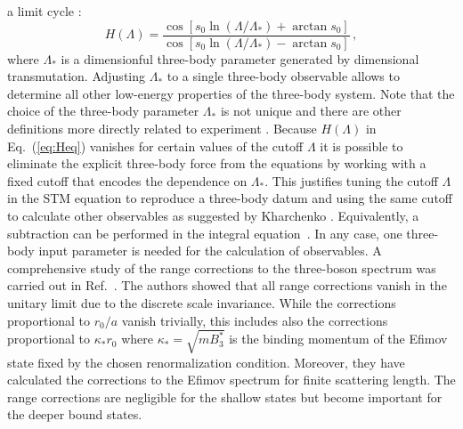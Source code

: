 \documentclass[aps,rmp,nofootinbib,twocolumn,floatfix]{revtex4}
\newcommand{\beq}{\begin{equation}}
\newcommand{\eeq}{\end{equation}}
\begin{document}
a limit cycle \cite{Bedaque:1998kg,Bedaque:1998km}:
\beq
H(\Lambda)=\frac{\cos[s_0 \ln(\Lambda/\Lambda_*)+\arctan s_0]}
{\cos[s_0 \ln(\Lambda/\Lambda_*)-\arctan s_0]}\,,
\label{eq:Heq}
\eeq
where $\Lambda_*$ is a dimensionful three-body parameter generated
by dimensional transmutation. Adjusting 
$\Lambda_*$ to a single three-body observable allows to determine all 
other low-energy properties of the three-body system.
Note that the choice of the three-body parameter $\Lambda_*$ is not unique
and there are other definitions more directly related to 
experiment \cite{Braaten:2004rn}.
Because $H(\Lambda)$ in Eq.~(\ref{eq:Heq}) vanishes for certain values of the 
cutoff $\Lambda$ it is possible to eliminate the explicit three-body force
from the equations by working with a fixed cutoff that encodes the
dependence on $\Lambda_*$. This justifies 
tuning the cutoff $\Lambda$ in the STM equation
to reproduce a three-body datum and using the same cutoff to calculate 
other observables as suggested by Kharchenko \cite{Kharchenko:1973aa}. 
Equivalently, a subtraction can  be
performed in the integral equation~\cite{Hammer:2000nf,Afnan:2003bs}.  
In any case, one
three-body input parameter is needed for the calculation of
observables.
A comprehensive study of the range corrections to the three-boson spectrum
was carried out in Ref.~\cite{Platter:2008cx}.
The authors showed that all range corrections vanish in the 
unitary limit due to the discrete scale invariance.
While the corrections proportional to $r_0 /a$ vanish trivially, 
this includes also the corrections proportional to 
$\kappa_* r_0$ where $\kappa_*=\sqrt{mB_3^*}$ is the binding momentum of the 
Efimov state fixed by the chosen renormalization condition.
Moreover, they have calculated the corrections to the Efimov spectrum
for finite scattering length. 
The range corrections are negligible for the 
shallow states but become important for the deeper bound states.
\end{document}
